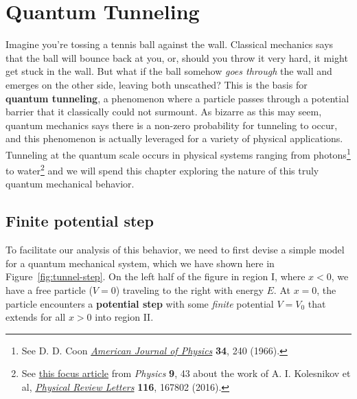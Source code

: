 %

%

\chapter{Quantum Tunneling} \label{ch:tunnel}
Imagine you're tossing a tennis ball against the wall. Classical mechanics says that the ball will bounce back at you, or, should you throw it very hard, it might get stuck in the wall. But what if the ball somehow \emph{goes through} the wall and emerges on the other side, leaving both unscathed? This is the basis for \textbf{quantum tunneling}, a phenomenon where a particle passes through a potential barrier that it classically could not surmount. As bizarre as this may seem, quantum mechanics says there is a non-zero probability for tunneling to occur, and this phenomenon is actually leveraged for a variety of physical applications. Tunneling at the quantum scale occurs in physical systems ranging from photons\footnote{See D. D. Coon \href{http://aapt.scitation.org/doi/10.1119/1.1972893}{\emph{American Journal of Physics}} \textbf{34}, 240 (1966).} to water\footnote{See \href{https://physics.aps.org/articles/v9/43}{this focus article} from \emph{Physics} \textbf{9}, 43 about the work of A. I. Kolesnikov et al, \href{https://journals.aps.org/prl/abstract/10.1103/PhysRevLett.116.167802}{\emph{Physical Review Letters}} \textbf{116}, 167802 (2016).} and we will spend this chapter exploring the nature of this truly quantum mechanical behavior.


\section{Finite potential step}
To facilitate our analysis of this behavior, we need to first devise a simple model for a quantum mechanical system, which we have shown here in Figure~\ref{fig:tunnel-step}. On the left half of the figure in region I, where $x < 0$, we have a free particle ($V=0$) traveling to the right with energy $E$. At $x=0$, the particle encounters a \textbf{potential step} with some \emph{finite} potential $V=V_0$ that extends for all $x>0$ into region II.

